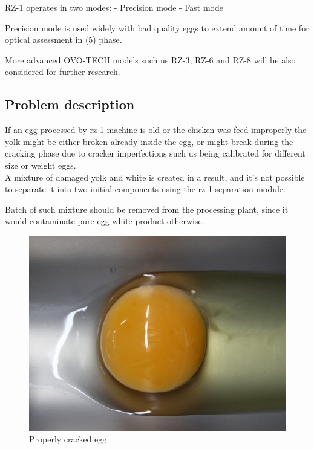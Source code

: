 \documentclass[12pt,twoside,a4paper]{article}
\begin{document}
RZ-1 operates in two modes:
- Precision mode
- Fast mode

Precision mode is used widely with bad quality eggs to extend amount of time for optical assessment in (5) phase.

More advanced OVO-TECH models such us RZ-3, RZ-6 and RZ-8 will be also considered for further research.

\subsection{Problem description}

If an egg processed by rz-1 machine is old or the chicken was feed improperly the yolk might be either broken already inside the egg, or might break during the cracking  phase due to cracker imperfections such us being calibrated for different size or weight eggs.\\
A mixture of damaged yolk and white is created in a result, and it’s not possible to separate it into two initial components using  the rz-1 separation  module.

Batch of such mixture should be removed from  the processing plant, since it would contaminate pure egg white product otherwise. 

\begin{figure}[H]
\centering
\includegraphics[width=0.4\paperwidth]{prop}
\caption{Properly cracked egg}
\end{figure} 
\end{document}

